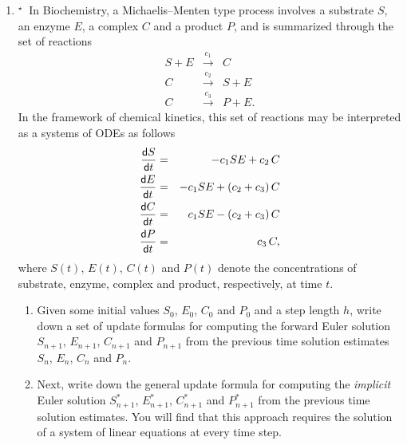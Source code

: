 \documentclass[11pt,a4paper]{article}
\newcommand{\dif}{\mathsf{d}}
\def\tough{$\!\!\!{}^\star\>$}
\begin{document}
\begin{enumerate}
{}{}%


\item \label{qdjsode3}\tough
In Biochemistry, a Michaelis--Menten type process involves
 a substrate $S$, an enzyme $E$, a complex $C$ and a product $P$, and is
 summarized through the set of  reactions 
 \begin{eqnarray*}
S + E &\stackrel{c_1}{\longrightarrow}& C\\
C  &\stackrel{c_2}{\longrightarrow}& S + E\\
C &\stackrel{c_3}{\longrightarrow}& P+E.
\end{eqnarray*}
In the framework of chemical kinetics, this set of reactions may be interpreted as
a systems of ODEs as follows
  \begin{eqnarray*}
{\dif S\over \dif t}   &= &  -c_1 S E  +c_2\,C\\
{\dif E\over \dif t}   &= &  -c_1 S E  + (c_2 +c_3) \,C\\
{\dif C\over \dif t}   &= &  c_1 S E  - (c_2 +c_3) \,C\\
{\dif P\over \dif t}   &= &  c_3 \,C,
\end{eqnarray*}
where  $S(t)$,   $E(t)$,  $C(t)$ and  $P(t)$ denote the concentrations of substrate,
enzyme, complex and product, respectively,  at time $t$. 

 \begin{enumerate}
\item 
Given some initial values $S_0$,   $E_0$,  $C_0$ and  $P_0$ and a step length $h$,
write down a set of update formulas for computing the forward Euler solution
 $S_{n+1}$,   $E_{n+1}$,  $C_{n+1}$ and  $P_{n+1}$   from the previous time
 solution estimates  $S_{n}$,   $E_{n}$,  $C_{n}$ and  $P_{n}$. 
 \item
 Next, write down the general update formula for computing the {\it implicit} Euler 
solution
$S^*_{n+1}$,   $E^*_{n+1}$,  $C^*_{n+1}$ and  $P^*_{n+1}$   from the previous 
time solution  estimates.  You will  find that this approach requires the solution of a 
system of linear equations at every time step.  
\end{enumerate}


\end{enumerate}
\end{document}
